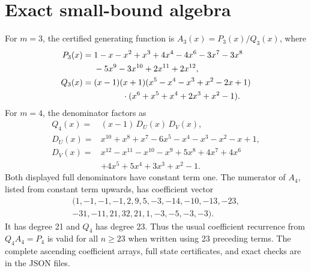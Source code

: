 \documentclass[11pt,a4paper]{article}
\theoremstyle{definition}\newaliascnt{definition}{theorem}
\theoremstyle{remark}\newaliascnt{remark}{theorem}
\begin{document}
\section{Exact small-bound algebra}
\label{app:algebra}
For $m=3$, the certified generating function is $A_3(x)=P_3(x)/Q_3(x)$, where
\begin{align*}
 P_3(x)={}&1-x-x^2+x^3+4x^4-4x^6-3x^7-3x^8\\
          &-5x^9-3x^{10}+2x^{11}+2x^{12},\\
 Q_3(x)={}&(x-1)(x+1)
 (x^5-x^4-x^3+x^2-2x+1)\\
          &\hspace{12mm}\cdot(x^6+x^5+x^4+2x^3+x^2-1).
\end{align*}
For $m=4$, the denominator factors as
\begin{align*}
 Q_4(x)={}&(x-1)\,D_U(x)\,D_V(x),\\
 D_U(x)={}&x^{10}+x^8+x^7-6x^5-x^4-x^3-x^2-x+1,\\
 D_V(x)={}&x^{12}-x^{11}-x^{10}-x^9+5x^8+4x^7+4x^6\\
          &+4x^5+5x^4+3x^3+x^2-1.
\end{align*}
Both displayed full denominators have constant term one. The numerator
of $A_4$, listed from constant term upwards, has coefficient vector
\[
\begin{gathered}
(1,-1,-1,-1,2,9,5,-3,-14,-10,-13,-23,\\
 -31,-11,21,32,21,1,-3,-5,-3,-3).
\end{gathered}
\]
It has degree 21 and $Q_4$ has degree 23. Thus the usual coefficient
recurrence from $Q_4A_4=P_4$ is valid for all $n\ge23$ when written using
23 preceding terms. The complete ascending coefficient arrays, full state
certificates, and exact checks are in the JSON files.
\end{document}

